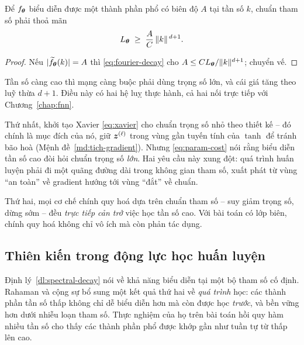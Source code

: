 \begin{hequa}
\label{hq:parameter-cost}
Để $f_{\bm{\theta}}$ biểu diễn được một thành phần phổ có biên độ $A$ tại tần số $k$,
chuẩn tham số phải thoả mãn
\begin{equation}
L_{\bm{\theta}} \;\ge\; \frac{A}{C}\,\lVert k\rVert^{\,d+1}.
\label{eq:param-cost}
\end{equation}
\end{hequa}
 
\begin{proof}
Nếu $\lvert\widetilde f_{\bm{\theta}}(k)\rvert = A$ thì \eqref{eq:fourier-decay} cho
$A \le C L_{\bm{\theta}}/\lVert k\rVert^{d+1}$; chuyển vế.
\end{proof}
 
Tần số càng cao thì mạng càng buộc phải dùng trọng số lớn, và cái giá tăng theo
luỹ thừa $d+1$. Điều này có hai hệ luỵ thực hành, cả hai nối trực tiếp với
Chương~\ref{chap:fnn}.
 
Thứ nhất, khởi tạo Xavier \eqref{eq:xavier} cho chuẩn trọng số nhỏ theo
thiết kế -- đó chính là mục đích của nó, giữ $\bm{z}^{(\ell)}$ trong vùng gần tuyến
tính của $\tanh$ để tránh bão hoà (Mệnh đề~\ref{md:tich-gradient}). Nhưng
\eqref{eq:param-cost} nói rằng biểu diễn tần số cao đòi hỏi chuẩn trọng số
\emph{lớn}. Hai yêu cầu này xung đột: quá trình huấn luyện phải đi một quãng
đường dài trong không gian tham số, xuất phát từ vùng ``an toàn'' về gradient
hướng tới vùng ``đắt'' về chuẩn.
 
Thứ hai, mọi cơ chế chính quy hoá dựa trên chuẩn tham số -- suy giảm trọng số,
dừng sớm -- đều \emph{trực tiếp cản trở} việc học tần số cao. Với bài toán có lớp
biên, chính quy hoá không chỉ vô ích mà còn phản tác dụng.
 
\subsection{Thiên kiến trong động lực học huấn luyện}
\label{subsec:dong-luc-hoc}
 
Định lý~\ref{dl:spectral-decay} nói về khả năng biểu diễn tại một bộ tham số cố
định. Rahaman và cộng sự bổ sung một kết quả thứ hai về \emph{quá trình} học: các
thành phần tần số thấp không chỉ dễ biểu diễn hơn mà còn được học \emph{trước},
và bền vững hơn dưới nhiễu loạn tham số. Thực nghiệm của họ trên bài toán hồi quy
hàm nhiều tần số cho thấy các thành phần phổ được khớp gần như tuần tự từ thấp
lên cao.
 
